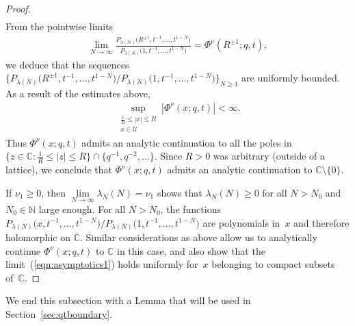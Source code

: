 \documentclass[pdftex]{sigma}
\numberwithin{equation}{section}
\newcommand{\C}{\mathbb{C}}
\newcommand{\N}{\mathbb{N}}
\newcommand{\U}{\mathcal{U}}
\begin{document}
\begin{proof}
\begin{gather*}
\end{gather*}
From the pointwise limits
\begin{gather*}
\lim_{N\rightarrow\infty}{\frac{P_{\lambda(N)}\big(R^{\pm 1}, t^{-1}, \dots, t^{1-N}\big)}{P_{\lambda(N)}\big(1, t^{-1}, \dots, t^{1-N}\big)}} = \Phi^{\nu}(R^{\pm 1}; q, t),
\end{gather*}
we deduce that the sequences $\big\{ P_{\lambda(N)}\big(R^{\pm 1}, t^{-1}, \dots, t^{1-N}\big)/P_{\lambda(N)}\big(1, t^{-1}, \dots, t^{1-N}\big) \big\}_{N\geq 1}$ are uniformly bounded. As a result of the estimates above,
\begin{gather*} \sup\limits_{\substack{\frac{1}{R} \leq |x| \leq R \\ x\in\U}}{|\Phi^{\nu}(x; q, t)|} < \infty.
 \end{gather*} Thus $\Phi^{\nu}(x; q, t)$ admits an analytic continuation to all the poles in $\big\{z\in\C\colon \frac{1}{R} \leq |z|\leq R\big\}\cap\big\{q^{-1}, q^{-2}, \dots\big\}$. Since $R>0$ was arbitrary (outside of a lattice), we conclude that $\Phi^{\nu}(x; q, t)$ admits an analytic continuation to $\C\setminus\{0\}$.

If $\nu_1 \geq 0$, then $\lim\limits_{N\rightarrow\infty}{\lambda_N(N)} = \nu_1$ shows that $\lambda_N(N)\geq 0$ for all $N > N_0$ and $N_0\in\N$ large enough. For all $N>N_0$, the functions ${P_{\lambda(N)}\big(x, t^{-1}, \dots, t^{1-N}\big)}/{P_{\lambda(N)}\big(1, t^{-1}, \dots, t^{1-N}\big)}$ are polynomials in~$x$ and therefore holomorphic on $\C$. Similar considerations as above allow us to analytically continue $\Phi^{\nu}(x; q, t)$ to $\C$ in this case, and also show that the limit~(\ref{eqn:asymptotics1}) holds uniformly for~$x$ belonging to compact subsets of~$\C$.
\end{proof}

We end this subsection with a Lemma that will be used in Section~\ref{sec:qtboundary}.
\end{document}

